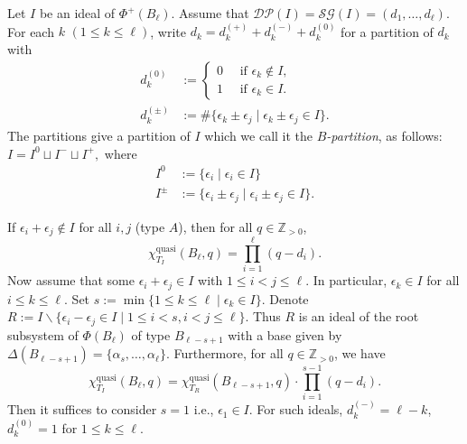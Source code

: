 \documentclass[12pt]{amsart}
\theoremstyle{plain}
\theoremstyle{definition}
\theoremstyle{remark}
\newcommand{\Z}{\mathbb{Z}}
\newcommand{\quasi}{\operatorname{quasi}}
\newcommand{\DP}{{\mathcal{DP}}}
\newcommand{\SG}{{\mathcal{SG}}}
\begin{document}
Let $I$ be an ideal of  $\Phi^+(B_\ell)$. 
Assume that $\DP(I)=\SG(I)=(d_1,\ldots,d_\ell)$. For each $k$ $(1 \le k \le \ell)$, write $d_k=d_k^{(+)}+d_k^{(-)}+d_k^{(0)}$ for a partition of $d_k$ with
\begin{equation*}
\label{eq:partition-dk}
\begin{aligned}
d_k^{(0)} & := 
\begin{cases}
0 \quad\mbox{ if $\epsilon_k  \notin I$}, \\ 
1 \quad\mbox{ if $\epsilon_k   \in I$}.
\end{cases}
\\
d_k^{(\pm)} & :=\#\{\epsilon_k \pm\epsilon_{j} \mid \epsilon_k \pm\epsilon_{j} \in I \}.
\end{aligned}
\end{equation*}
The partitions give a partition of $I$ which we call it the \emph{$B$-partition}, as follows: $I =I^{0} \sqcup I^{-} \sqcup I^{+},$ where
\begin{equation*}
\label{eq:B-partition}
\begin{aligned}
I^{0} & := \{\epsilon_i \mid \epsilon_i   \in I\}\\
I^{\pm} & := \{\epsilon_i\pm\epsilon_j \mid \epsilon_i \pm\epsilon_{j} \in I \}.
\end{aligned}
\end{equation*}

If $\epsilon_i + \epsilon_{j} \notin I$ for all $i, j$ (type $A$), then for all $q \in \Z_{>0}$, 
\begin{equation}
\label{eq:type-A}
\chi^{\quasi}_{T_I}(B_\ell, q) = \prod_{i=1}^\ell (q-d_i).
\end{equation}
Now assume that some $\epsilon_i + \epsilon_{j} \in I$ with $1 \le i < j \le \ell$. 
In particular, $\epsilon_k \in I$ for all $i \le k \le \ell$. 
Set $s:=\min \{ 1 \le k \le \ell \mid \epsilon_k \in I\}$. 
Denote $R:=I \smallsetminus \{\epsilon_i - \epsilon_{j} \in I \mid 1\le i<s, i <j \le \ell\}$. 
Thus $R$ is an ideal of the root subsystem of $\Phi(B_\ell)$ of  type $B_{\ell-s+1}$ with a base given by $\Delta(B_{\ell-s+1})=\{\alpha_s,\ldots,\alpha_\ell\}$. 
Furthermore, for all $q \in \Z_{>0}$, we have
\begin{equation*}\label{eq:inductive-B}
\chi^{\quasi}_{T_I}(B_\ell, q) =\chi^{\quasi}_{T_R}(B_{\ell-s+1}, q)\cdot \prod_{i=1}^{s-1}(q-d_i).
\end{equation*}
Then it suffices to consider $s=1$ i.e., $\epsilon_1 \in I$. 
For such ideals, $d_k^{(-)} = \ell-k$, $d_k^{(0)}=1$ for $1 \le k \le \ell$. 
\end{document}
